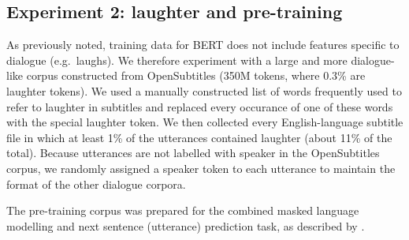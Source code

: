 \documentclass[11pt,a4paper]{article}
\begin{document}
\begin{lingex}
\item\label{ex:rhet-qu}
  \small
\end{lingex}




\subsection{Experiment 2: laughter and pre-training}
\label{sec:exper-2:-laught}

As previously noted, training data for BERT does not include
features specific to dialogue (e.g.\ laughs). We therefore  experiment
with a large and more dialogue-like corpus constructed from
OpenSubtitles \citep{Lison2016} (350M tokens, where 0.3\% are laughter
tokens).  We used a manually constructed list of words frequently used
to refer to laughter in subtitles and replaced every occurance of one
of these words with the special laughter token.  We then collected
every English-language subtitle file in which at least 1\% of the
utterances contained laughter (about 11\% of the total).  Because
utterances are not labelled with speaker in the OpenSubtitles corpus,
we randomly assigned a speaker token to each utterance to maintain the
format of the other dialogue corpora.

The pre-training corpus was prepared for the combined masked language
modelling and next sentence (utterance) prediction task, as described
by \citet{devlinBERTPretrainingDeep2018}.
\end{document}
